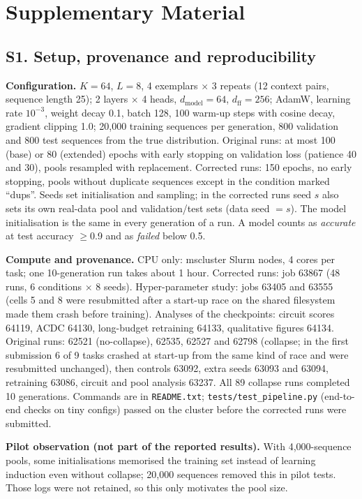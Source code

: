 \documentclass[10pt,letterpaper]{article}
\begin{document}
\section*{Supplementary Material}

\subsection*{S1. Setup, provenance and reproducibility}
\textbf{Configuration.} $K{=}64$, $L{=}8$, 4 exemplars $\times$ 3 repeats (12 context
pairs, sequence length 25); 2 layers $\times$ 4 heads, $d_\text{model}{=}64$,
$d_\text{ff}{=}256$; AdamW, learning rate $10^{-3}$, weight decay 0.1, batch 128, 100
warm-up steps with cosine decay, gradient clipping 1.0; 20{,}000 training sequences per
generation, 800 validation and 800 test sequences from the true distribution. Original
runs: at most 100 (base) or 80 (extended) epochs with early stopping on validation loss
(patience 40 and 30), pools resampled with replacement. Corrected runs: 150 epochs, no
early stopping, pools without duplicate sequences except in the condition marked
``dups''. Seeds set initialisation and sampling; in the corrected runs seed $s$ also
sets its own real-data pool and validation/test sets (data seed $=s$). The model
initialisation is the same in every generation of a run. A model counts as
\emph{accurate} at test accuracy $\ge$0.9 and as \emph{failed} below 0.5.

\textbf{Compute and provenance.} CPU only: mscluster Slurm nodes, 4 cores per task;
one 10-generation run takes about 1 hour. Corrected runs: job 63867 (48 runs, 6
conditions $\times$ 8 seeds). Hyper-parameter study: jobs 63405 and 63555 (cells 5 and
8 were resubmitted after a start-up race on the shared filesystem made them crash
before training). Analyses of the checkpoints: circuit scores 64119, ACDC 64130,
long-budget retraining 64133, qualitative figures 64134. Original runs: 62521
(no-collapse), 62535, 62527 and 62798 (collapse; in the first submission 6 of 9 tasks
crashed at start-up from the same kind of race and were resubmitted unchanged), then
controls 63092, extra seeds 63093 and 63094, retraining 63086, circuit and pool
analysis 63237. All 89 collapse runs completed 10 generations. Commands are in
\texttt{README.txt}; \texttt{tests/test\_pipeline.py} (end-to-end checks on tiny
configs) passed on the cluster before the corrected runs were submitted.

\textbf{Pilot observation (not part of the reported results).} With 4{,}000-sequence
pools, some initialisations memorised the training set instead of learning induction
even without collapse; 20{,}000 sequences removed this in pilot tests. Those logs were
not retained, so this only motivates the pool size.
\end{document}
